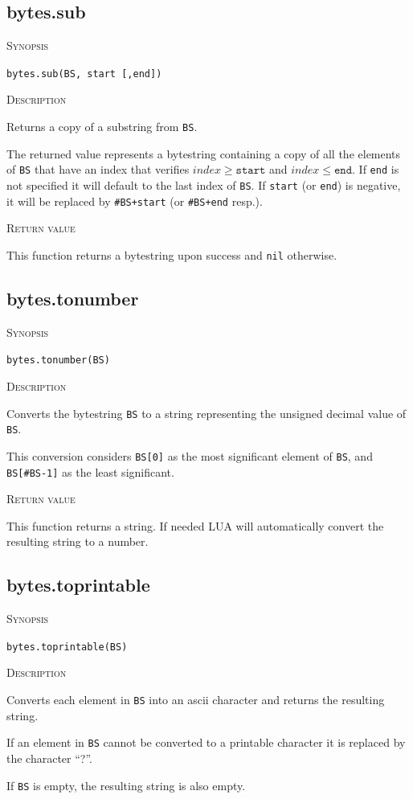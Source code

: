 \documentclass[11pt]{report}
\newcommand{\mansection}[1]{\vspace{0.5em}\par\noindent\textsc{#1}\vspace{0.5em}\par}
\newcommand{\syn}[1]{\texttt{#1}}
\begin{document}
\subsection{bytes.sub}

\mansection{Synopsis}
\syn{bytes.sub(BS, start [,end])}

\mansection{Description}
  Returns a copy of a substring from \syn{BS}.

  The returned value represents a bytestring containing a copy of all the 
  elements of \syn{BS} that have an index that verifies $index \geq \syn{start}$ and 
  $index \leq \syn{end}$.
  If \syn{end} is not specified it will default to the last index of \syn{BS}.
  If \syn{start} (or \syn{end}) is negative, it will be replaced by \syn{\#BS+start}
  (or \syn{\#BS+end} resp.).

\mansection{Return value}
  This function returns a bytestring upon success and \syn{nil} otherwise.


\subsection{bytes.tonumber}

\mansection{Synopsis}
\syn{bytes.tonumber(BS)}

\mansection{Description}
  Converts the bytestring \syn{BS} to a string representing the unsigned 
  decimal value of \syn{BS}.

  This conversion considers \syn{BS[0]} as the most significant element of \syn{BS}, 
  and \syn{BS[\#BS-1]} as the least significant. 
  
\mansection{Return value}
  This function returns a string.
  If needed LUA will automatically convert the resulting string to a number.


\subsection{bytes.toprintable}

\mansection{Synopsis}
\syn{bytes.toprintable(BS)}

\mansection{Description}
  Converts each element in \syn{BS} into an ascii character and returns the
  resulting string.

  If an element in \syn{BS} cannot be converted to a printable character it
  is replaced by the character ``?''. 

  If \syn{BS} is empty, the resulting string is also empty.
\end{document}
